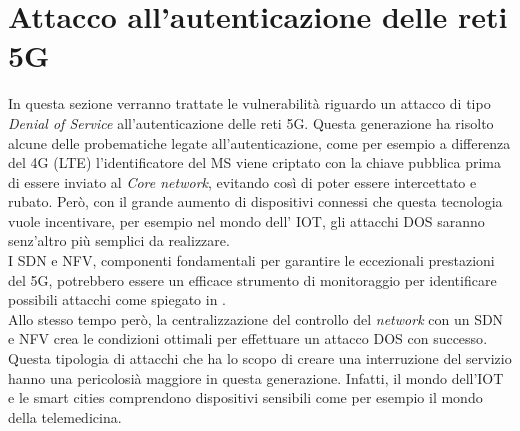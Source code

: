 \chapter{Attacco all'autenticazione delle reti 5G}
In questa sezione verranno trattate le vulnerabilità riguardo un attacco di tipo \textit{Denial of Service} all'autenticazione delle reti 5G.
Questa generazione ha risolto alcune delle probematiche legate all'autenticazione, come per esempio a differenza del 4G (LTE) l'identificatore 
del MS viene criptato con la chiave pubblica prima di essere inviato al \textit{Core network}, evitando così di poter essere intercettato e rubato\cite{5g-vs-4g}.
Però, con il grande aumento di dispositivi connessi che questa tecnologia vuole incentivare, per esempio nel mondo dell' IOT, gli attacchi DOS saranno senz'altro più 
semplici da realizzare.\\
I SDN e NFV, componenti fondamentali per garantire le eccezionali prestazioni del 5G, potrebbero essere un efficace strumento di monitoraggio per identificare possibili 
attacchi come spiegato in \cite{dos-detection-with-sdn}.\\
Allo stesso tempo però, la centralizzazione del controllo del \textit{network} con un SDN e NFV crea le condizioni ottimali per effettuare un attacco DOS con successo\cite{5g-dos}.\\
Questa tipologia di attacchi che ha lo scopo di creare una interruzione del servizio hanno una pericolosià maggiore in questa generazione. Infatti, il mondo dell'IOT e le smart cities comprendono 
dispositivi sensibili come per esempio il mondo della telemedicina.

\clearpage

